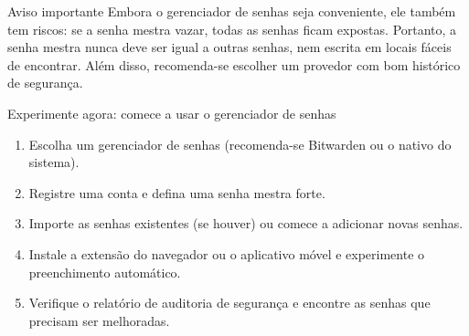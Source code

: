\begin{tcbwarn}{Aviso importante}
Embora o gerenciador de senhas seja conveniente, ele também tem riscos: se a senha mestra vazar, todas as senhas ficam expostas. Portanto, a senha mestra nunca deve ser igual a outras senhas, nem escrita em locais fáceis de encontrar. Além disso, recomenda-se escolher um provedor com bom histórico de segurança.

\end{tcbwarn}

\begin{tcbpractice}{Experimente agora: comece a usar o gerenciador de senhas}
\begin{enumerate}
  \item Escolha um gerenciador de senhas (recomenda-se Bitwarden ou o nativo do sistema).
  \item Registre uma conta e defina uma senha mestra forte.
  \item Importe as senhas existentes (se houver) ou comece a adicionar novas senhas.
  \item Instale a extensão do navegador ou o aplicativo móvel e experimente o preenchimento automático.
  \item Verifique o relatório de auditoria de segurança e encontre as senhas que precisam ser melhoradas.
\end{enumerate}

\end{tcbpractice}
